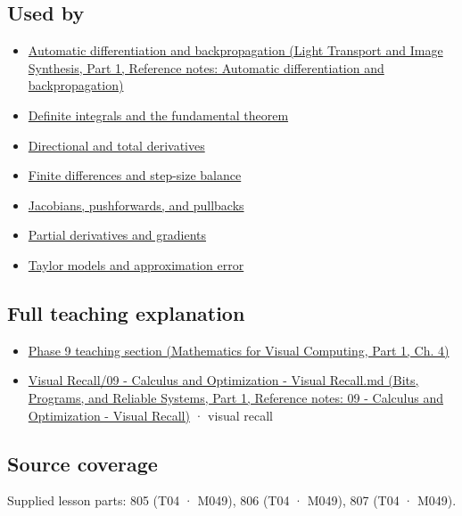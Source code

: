 \subsection{Used by}\label{appendix-7bc181935c42-used-by}

\hypertarget{appendix-7bc181935c42-used-by}{}

\begin{itemize}
\tightlist
\item
  \href{../04-Light-Transport-and-Image-Synthesis-P01/main.pdf\#nameddest=appendix-40df0855b4a7}{Automatic differentiation and backpropagation (Light Transport and Image Synthesis, Part 1, Reference notes: Automatic differentiation and backpropagation)}
\item
  \hyperref[appendix-1a50e72435c2]{Definite integrals and the fundamental theorem}
\item
  \hyperref[appendix-e2d476574aab]{Directional and total derivatives}
\item
  \hyperref[appendix-e2d7b4f2161d]{Finite differences and step-size balance}
\item
  \hyperref[appendix-d8a7ddb675eb]{Jacobians, pushforwards, and pullbacks}
\item
  \hyperref[appendix-677b59746ae0]{Partial derivatives and gradients}
\item
  \hyperref[appendix-32f39e9a3738]{Taylor models and approximation error}
\end{itemize}

\subsection{Full teaching explanation}\label{appendix-7bc181935c42-full-teaching-explanation}

\hypertarget{appendix-7bc181935c42-full-teaching-explanation}{}

\begin{itemize}
\tightlist
\item
  \href{../02-Mathematics-for-Visual-Computing-P01/main.pdf\#nameddest=01-foundations-i-ch020-functions-limits-continuity-and-scalar-change}{Phase 9 teaching section (Mathematics for Visual Computing, Part 1, Ch. 4)}
\item
  \href{../01-Bits-Programs-and-Reliable-Systems-P01/main.pdf\#nameddest=appendix-adf48f5dc5c1}{Visual Recall/09 - Calculus and Optimization - Visual Recall.md (Bits, Programs, and Reliable Systems, Part 1, Reference notes: 09 - Calculus and Optimization - Visual Recall)} · visual recall
\end{itemize}

\subsection{Source coverage}\label{appendix-7bc181935c42-source-coverage}

\hypertarget{appendix-7bc181935c42-source-coverage}{}

Supplied lesson parts: 805 (T04 · M049), 806 (T04 · M049), 807 (T04 · M049).
